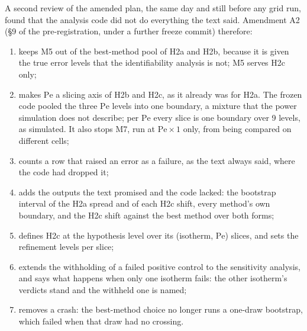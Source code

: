 \documentclass[11pt]{article}
\newcommand{\Pe}{\mathrm{Pe}}
\begin{document}
A second review of the amended plan, the same day and still before any grid run, found
that the analysis code did not do everything the text said. Amendment A2 (\S9 of the
pre-registration, under a further freeze commit) therefore:
\begin{enumerate}
\item keeps M5 out of the best-method pool of H2a and H2b, because it is given the true
error levels that the identifiability analysis is not; M5 serves H2c only;
\item makes $\Pe$ a slicing axis of H2b and H2c, as it already was for H2a. The frozen code
pooled the three $\Pe$ levels into one boundary, a mixture that the power simulation does not
describe; per $\Pe$ every slice is one boundary over 9 levels, as simulated. It also stops
M7, run at $\Pe\times1$ only, from being compared on different cells;
\item counts a row that raised an error as a failure, as the text always said, where the
code had dropped it;
\item adds the outputs the text promised and the code lacked: the bootstrap interval of the
H2a spread and of each H2c shift, every method's own boundary, and the H2c shift against
the best method over both forms;
\item defines H2c at the hypothesis level over its (isotherm, $\Pe$) slices, and sets the
refinement levels per slice;
\item extends the withholding of a failed positive control to the sensitivity analysis, and
says what happens when only one isotherm fails: the other isotherm's verdicts stand and the
withheld one is named;
\item removes a crash: the best-method choice no longer runs a one-draw bootstrap, which
failed when that draw had no crossing.
\end{enumerate}
\end{document}
